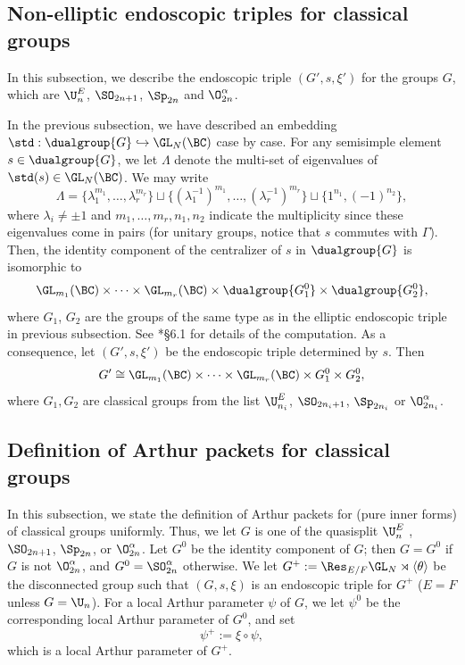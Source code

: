 \documentclass[11pt,letterpaper]{amsart}
\numberwithin{equation}{section}
\begin{document}
\subsection{Non-elliptic endoscopic triples for classical groups}\label{subsection: G'}

In this subsection, we describe the endoscopic triple $(G', s, \xi')$ for the groups $G$, which are $\U^E_n$, $\SO_{2n+1}$, $\Sp_{2n}$ and $\O^{\alpha}_{2n}$. 

In the previous subsection, we have described an embedding $\std: \dualgroup{G} \hookrightarrow \GL_N(\BC)$ case by case. For any semisimple element $s \in \dualgroup{G}$, we let $\Lambda$ denote the multi-set of eigenvalues of $\std(s) \in \GL_N(\BC)$. We may write 
\[ \Lambda= \{\lambda_1^{m_1},\ldots, \lambda_{r}^{m_r}\} \sqcup \{(\lambda_1^{-1})^{m_1},\ldots, (\lambda_{r}^{-1})^{m_r}\} \sqcup \{1^{n_1}, (-1)^{n_2}\}, \]
where $\lambda_i \neq \pm 1$ and $m_1,\ldots, m_r, n_1, n_2$ indicate the multiplicity since 
these eigenvalues come in pairs (for unitary groups, notice that $s$ commutes with $\Gamma$). 
Then, the identity component of the centralizer of $s$ in $\dualgroup{G}$ is isomorphic to
\[ 
\GL_{m_1}(\BC) \times \cdots \times \GL_{m_r}(\BC) \times \dualgroup{G_1^0} \times \dualgroup{G_2^0}, 
\]
where $G_1$, $G_2$ are the groups of the same type as in the elliptic endoscopic triple in previous subsection. See \cite{LLS24}*{\S 6.1} for details of the computation. As a consequence, let $(G', s, \xi')$ be the endoscopic triple determined by $s$. Then 
\begin{align}\label{eq non-elliptic endoscopic group}
    G' \cong \GL_{m_1}(\BC) \times \cdots \times \GL_{m_r}(\BC) \times G_1^0 \times G_2^0,
\end{align}
where $G_1, G_2$ are classical groups from the list $\U^E_{n_i}$, $\SO_{2n_i+1}$, $\Sp_{2n_i}$ or $\O^{\alpha}_{2n_i}$. 

\subsection{Definition of Arthur packets for classical groups}\label{subsection: Arthur conjectures}

In this subsection, we state the definition of Arthur packets for (pure inner forms) of classical groups uniformly. Thus, we let $G$ is one of the quasisplit $\U_{n}^E$ , $\SO_{2n+1}$, $\Sp_{2n}$, or $\O_{2n}^{\alpha}$. 
Let $G^{0}$ be the identity component of $G$; then $G=G^{0}$ if $G$ is not $\O_{2n}^{\alpha}$, and $G^{0}= \SO_{2n}^{\alpha}$ otherwise. 
We let $G^+:=\Res_{E/F}\GL_N\rtimes \langle \theta \rangle$ be the disconnected group such that $(G, s, \xi)$ is an endoscopic triple for $G^+$ ($E=F$ unless $G = \U_n$).
For a local Arthur parameter $\psi$ of $G$, we let $\psi^0$ be the corresponding local Arthur parameter of $G^0$, and set 
\[ \psi^+:= \xi \circ \psi,\]
which is a local Arthur parameter of $G^+$.
\end{document}
